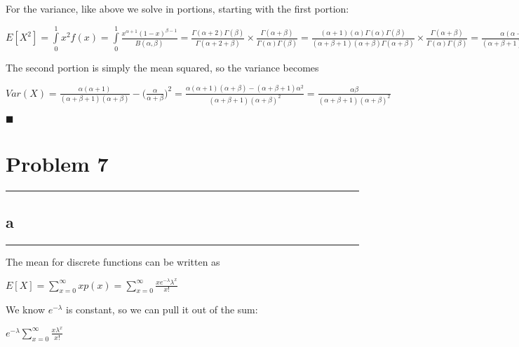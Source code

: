 \documentclass[]{tufte-handout}
\begin{document}
For the variance, like above we solve in portions, starting with the
first portion:

\(E[X^2] = \int \limits_0^1x^2f(x) = \int \limits_0^1 \frac{x^{\alpha+1}(1-x)^{\beta-1}}{B(\alpha, \beta)} = \frac{\Gamma(\alpha + 2)\Gamma(\beta)}{\Gamma(\alpha + 2 + \beta)} \times \frac{\Gamma(\alpha + \beta)}{\Gamma(\alpha)\Gamma(\beta)} = \frac{(\alpha + 1)(\alpha)\Gamma(\alpha)\Gamma(\beta)}{(\alpha + \beta + 1)(\alpha+\beta)\Gamma(\alpha + \beta)} \times \frac{\Gamma(\alpha + \beta)}{\Gamma(\alpha)\Gamma(\beta)} = \frac{\alpha(\alpha+1)}{(\alpha + \beta + 1)(\alpha + \beta)}\)

The second portion is simply the mean squared, so the variance becomes

\(Var(X) = \frac{\alpha(\alpha+1)}{(\alpha + \beta + 1)(\alpha + \beta)} - \Big(\frac{\alpha}{\alpha + \beta}\Big)^2 = \frac{\alpha(\alpha+1)(\alpha + \beta) - (\alpha + \beta + 1)\alpha^2}{(\alpha + \beta + 1)(\alpha + \beta)^2} = \frac{\alpha\beta}{(\alpha + \beta + 1)(\alpha + \beta)^2}\)

\begin{marginfigure}
\(\blacksquare\)
\end{marginfigure}

\hypertarget{problem-7}{%
\section{Problem 7}\label{problem-7}}

\begin{center}\rule{0.5\linewidth}{0.5pt}\end{center}

\hypertarget{a-5}{%
\subsection{a}\label{a-5}}

\begin{center}\rule{0.5\linewidth}{0.5pt}\end{center}

The mean for discrete functions can be written as

\(E[X] = \sum\limits_{x = 0}^{\infty}xp(x) = \sum\limits_{x = 0}^{\infty}\frac{xe^{-\lambda}\lambda^x}{x!}\)

We know \(e^{-\lambda}\) is constant, so we can pull it out of the sum:

\(e^{-\lambda}\sum\limits_{x = 0}^{\infty}\frac{x\lambda^x}{x!}\)
\end{document}

